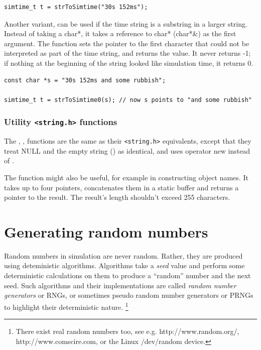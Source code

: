 \begin{verbatim}
simtime_t t = strToSimtime("30s 152ms");
\end{verbatim}

Another variant,  can be used if the time
string is a substring in a larger string. Instead of taking a char*,
it takes a reference to char* (char*\&) as the first argument.  The
function sets the pointer to the first character that could not be
interpreted as part of the time string, and returns the value. It
never returns -1; if nothing at the beginning of the string looked
like simulation time, it returns 0.

\begin{verbatim}
const char *s = "30s 152ms and some rubbish";

simtime_t t = strToSimtime0(s); // now s points to "and some rubbish"
\end{verbatim}

\subsubsection{Utility \texttt{<string.h>} functions}

\begin{sloppypar}
The , , 
functions are the same as their \texttt{<string.h>} equivalents,
except that they treat NULL and the empty string () as identical,
and  uses operator new instead of .
\end{sloppypar}

The  function might also be useful, for example
in constructing object names. It takes up to four 
pointers, concatenates them in a static buffer and returns a pointer
to the result. The result's length shouldn't exceed 255 characters.



\section{Generating random numbers}

Random numbers in simulation are never random. Rather, they are
produced using deteministic algorithms. Algorithms take a \textit{seed} value
and perform some deterministic calculations on them to produce
a ``random'' number and the next seed. Such algorithms and their
implementations are called \textit{random number generators} or RNGs,
or sometimes pseudo random number generators or PRNGs to highlight
their deterministic nature.
  \footnote{There exist real random numbers too, see e.g.
  http://www.random.org/, http://www.comscire.com, or the Linux
  /dev/random device.}


